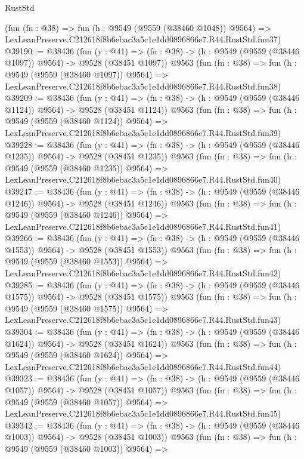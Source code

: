 \begin{lexlean}{RustStd}
\begin{coremodule}
    (fun (fn : @38) =>
    fun (h : @9549 (@9559 (@38460 @1048)) @9564) =>
    LexLeanPreserve.C212618f8b6ebac3a5c1e1dd0896866e7.R44.RustStd.fun37)
@39190 := @38436
    (fun (y : @41) =>
    (fn : @38) -> (h : @9549 (@9559 (@38446 @1097)) @9564) -> @9528 (@38451 @1097))
    @9563
    (fun (fn : @38) =>
    fun (h : @9549 (@9559 (@38460 @1097)) @9564) =>
    LexLeanPreserve.C212618f8b6ebac3a5c1e1dd0896866e7.R44.RustStd.fun38)
@39209 := @38436
    (fun (y : @41) =>
    (fn : @38) -> (h : @9549 (@9559 (@38446 @1124)) @9564) -> @9528 (@38451 @1124))
    @9563
    (fun (fn : @38) =>
    fun (h : @9549 (@9559 (@38460 @1124)) @9564) =>
    LexLeanPreserve.C212618f8b6ebac3a5c1e1dd0896866e7.R44.RustStd.fun39)
@39228 := @38436
    (fun (y : @41) =>
    (fn : @38) -> (h : @9549 (@9559 (@38446 @1235)) @9564) -> @9528 (@38451 @1235))
    @9563
    (fun (fn : @38) =>
    fun (h : @9549 (@9559 (@38460 @1235)) @9564) =>
    LexLeanPreserve.C212618f8b6ebac3a5c1e1dd0896866e7.R44.RustStd.fun40)
@39247 := @38436
    (fun (y : @41) =>
    (fn : @38) -> (h : @9549 (@9559 (@38446 @1246)) @9564) -> @9528 (@38451 @1246))
    @9563
    (fun (fn : @38) =>
    fun (h : @9549 (@9559 (@38460 @1246)) @9564) =>
    LexLeanPreserve.C212618f8b6ebac3a5c1e1dd0896866e7.R44.RustStd.fun41)
@39266 := @38436
    (fun (y : @41) =>
    (fn : @38) -> (h : @9549 (@9559 (@38446 @1553)) @9564) -> @9528 (@38451 @1553))
    @9563
    (fun (fn : @38) =>
    fun (h : @9549 (@9559 (@38460 @1553)) @9564) =>
    LexLeanPreserve.C212618f8b6ebac3a5c1e1dd0896866e7.R44.RustStd.fun42)
@39285 := @38436
    (fun (y : @41) =>
    (fn : @38) -> (h : @9549 (@9559 (@38446 @1575)) @9564) -> @9528 (@38451 @1575))
    @9563
    (fun (fn : @38) =>
    fun (h : @9549 (@9559 (@38460 @1575)) @9564) =>
    LexLeanPreserve.C212618f8b6ebac3a5c1e1dd0896866e7.R44.RustStd.fun43)
@39304 := @38436
    (fun (y : @41) =>
    (fn : @38) -> (h : @9549 (@9559 (@38446 @1624)) @9564) -> @9528 (@38451 @1624))
    @9563
    (fun (fn : @38) =>
    fun (h : @9549 (@9559 (@38460 @1624)) @9564) =>
    LexLeanPreserve.C212618f8b6ebac3a5c1e1dd0896866e7.R44.RustStd.fun44)
@39323 := @38436
    (fun (y : @41) =>
    (fn : @38) -> (h : @9549 (@9559 (@38446 @1057)) @9564) -> @9528 (@38451 @1057))
    @9563
    (fun (fn : @38) =>
    fun (h : @9549 (@9559 (@38460 @1057)) @9564) =>
    LexLeanPreserve.C212618f8b6ebac3a5c1e1dd0896866e7.R44.RustStd.fun45)
@39342 := @38436
    (fun (y : @41) =>
    (fn : @38) -> (h : @9549 (@9559 (@38446 @1003)) @9564) -> @9528 (@38451 @1003))
    @9563
    (fun (fn : @38) =>
    fun (h : @9549 (@9559 (@38460 @1003)) @9564) =>

\end{coremodule}
\end{lexlean}
